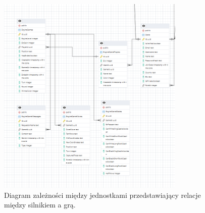 \documentclass[12pt,a4paper]{article}
\begin{document}
\begin{figure}[h!]
    \centering
    \includegraphics[width=0.8\textwidth]{zdj/offline_ERD.png}
    \caption{Diagram zależności między jednostkami przedstawiający relacje między silnikiem a grą.}
    
\end{figure}
\newpage
\end{document}
